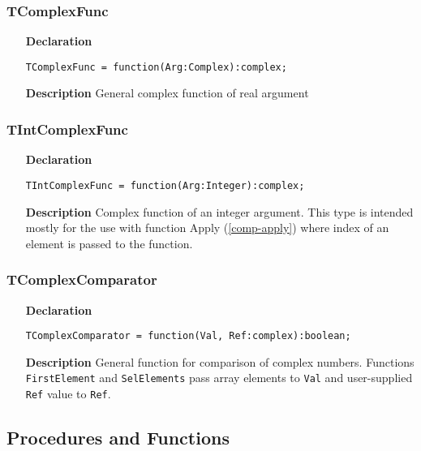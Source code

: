 \documentclass[12pt,a4paper,oneside]{report}
\newcommand{\declarationitem}[1]{\textbf{#1}}
\newcommand{\descriptiontitle}[1]{\textbf{#1}}
\newcommand{\code}[1]{\texttt{#1}}
\begin{document}
\subsubsection{TComplexFunc}
\label{tcomplexfunc}
\begin{itemize}
	\item[\declarationitem{Declaration}\hfill]
	\begin{flushleft}
  \code{TComplexFunc = function(Arg:Complex):complex;}
	\end{flushleft}
	\item[\descriptiontitle{Description}]
  General complex function of real argument
\end{itemize}	
\subsubsection{TIntComplexFunc}
\label{tintcomplexfunc}
\begin{itemize}
	\item[\declarationitem{Declaration}\hfill]
	\begin{flushleft}
	\code{TIntComplexFunc = function(Arg:Integer):complex;}	
	\end{flushleft}
	\item[\descriptiontitle{Description}]
	Complex function of an integer argument. This type is intended mostly for the use with function Apply (\ref{comp-apply}) where index of an element is passed to the function.
\end{itemize}	

\subsubsection{TComplexComparator}
\label{tcomplexcomparator}
\begin{itemize}
	\item[\declarationitem{Declaration}\hfill]
	\begin{flushleft}
 \code{TComplexComparator = function(Val, Ref:complex):boolean;}
	\end{flushleft}
	\item[\descriptiontitle{Description}]
  General function for comparison of complex numbers.
 Functions \code{FirstElement} and \code{SelElements} pass array elements to \code{Val} and user-supplied \code{Ref} value to \code{Ref}.
\end{itemize}	
\subsection{Procedures and Functions}
\end{document}
